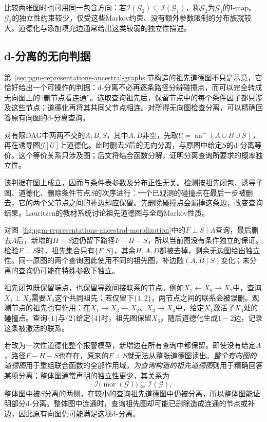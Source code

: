 比较两张图时也可用同一包含方向：若$\mathcal{I}(\mathcal{G}_2)\subseteq\mathcal{I}(\mathcal{G}_1)$，称$\mathcal{G}_2$为$\mathcal{G}_1$的I-map。$\mathcal{G}_2$的独立性约束较少，仅受这些Markov约束、没有额外参数限制的分布族就较大。道德化与添加填充边通常给出这类较弱的独立性描述。

\subsection{d-分离的无向判据}
\label{sec:pgm-representations-ancestral-moralization}

第~\ref{sec:pgm-representations-ancestral-graphs}节构造的祖先道德图不只是示意，它恰好给出一个可操作的判据：d-分离不必再逐条路径分辨碰撞点，而可以完全转成无向图上的“删节点看连通”。选取查询祖先后，保留节点中的每个条件因子都只涉及这些节点；道德化再将其共同父节点相连。对所得无向图检查分离，可以精确回答原有向图的d-分离查询。

对有限DAG中两两不交的$A,B,S$，其中$A,B$非空，先取$U=\operatorname{an}^{+}(A\cup B\cup S)$，再在诱导图$\mathcal G[U]$上道德化。此时删去$S$后的无向分离，与原图中给定$S$的d-分离等价。这个等价关系只涉及图；后文将结合函数分解，证明分离查询所要求的概率独立性。

该判据在图上成立，因而与条件表参数及分布正性无关。检测按祖先闭包、诱导子图、道德化、删除条件节点$S$的次序进行：一个已观测的碰撞点在最后一步被删去，它的两个父节点之间的补边却应保留。先删除碰撞点会漏掉这条边，改变查询结果。Lauritzen的教材系统讨论祖先道德图与全局Markov性质。

对图~\ref{fig:pgm-representations-ancestral-moralization}中的$F\perp S\mid A$查询，最后删去$A$后，新增的$H-S$边仍留下路径$F-H-S$，所以当前图没有条件独立的保证。检验$F\perp S$时，祖先集合只有$\{F,S\}$，其余$H,A,D$都被去掉，剩余无边图给出独立性。同一原图的两个查询因此使用不同的祖先图，补边随$(A,B\mid S)$变化；未分离的查询仍可能在特殊参数下独立。

祖先闭包既保留端点，也保留导致间接联系的节点。例如$X_1\leftarrow X_0\to X_2$中，查询$X_1\perp X_2$需要$X_0$这个共同祖先；若仅留下$\{1,2\}$，两节点之间的联系会被误删。观测节点的祖先也有作用：在$X_1\to X_3\leftarrow X_2$、$X_3\to X_4$中，给定$X_4$激活了$X_3$处的碰撞点。查询$\{1\}$与$\{2\}$给定$\{4\}$时，祖先图保留$X_3$，随后道德化生成$1-2$边，记录这条被激活的联系。

若改为一次性道德化整个报警模型，新增边在所有查询中都保留。即使没有给定$A$，路径$F-H-S$也存在，原来的$F\perp S$就无法从整张道德图读出。\emph{整个有向图的道德图}用于重组联合函数的全部作用域，\emph{为查询构造的祖先道德图}则用于精确回答某项分离；整体图通常声明的独立性更少，其关系为
\begin{equation}
  \mathcal{I}\bigl(\operatorname{mor}(\mathcal{G})\bigr)
  \subseteq \mathcal{I}(\mathcal{G}),
  \label{eq:pgm-representations-moral-inclusion}
\end{equation}
整体图中被$S$分离的两侧，在较小的查询祖先道德图中仍被分离，所以整体图能证明部分d-分离。整体图中连通时，查询祖先图却可能已删除造成连通的节点或补边，因此原有向图仍可能满足这项d-分离。

